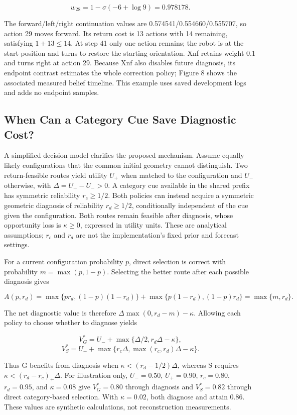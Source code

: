 \documentclass[11pt,a4paper]{article}
\begin{document}
\[
w_{28}=1-\sigma(-6+\log9)=0.978178.
\]

The forward/left/right continuation values are 0.574541/0.554660/0.555707, so action 29 moves forward. Its return cost is 13 actions with 14 remaining, satisfying \(1+13\le14\). At step 41 only one action remains; the robot is at the start position and turns to restore the starting orientation. Xnf retains weight 0.1 and turns right at action 29. Because Xnf also disables future diagnosis, its endpoint contrast estimates the whole correction policy; Figure 8 shows the associated measured belief timeline. This example uses saved development logs and adds no endpoint samples.

\hypertarget{when-can-a-category-cue-save-diagnostic-cost}{%
\subsection{When Can a Category Cue Save Diagnostic Cost?}\label{when-can-a-category-cue-save-diagnostic-cost}}

A simplified decision model clarifies the proposed mechanism. Assume equally likely configurations that the common initial geometry cannot distinguish. Two return-feasible routes yield utility \(U_+\) when matched to the configuration and \(U_-\) otherwise, with \(\Delta=U_+-U_->0\). A category cue available in the shared prefix has symmetric reliability \(r_c\ge1/2\). Both policies can instead acquire a symmetric geometric diagnosis of reliability \(r_d\ge1/2\), conditionally independent of the cue given the configuration. Both routes remain feasible after diagnosis, whose opportunity loss is \(\kappa\ge0\), expressed in utility units. These are analytical assumptions; \(r_c\) and \(r_d\) are not the implementation's fixed prior and forecast settings.

For a current configuration probability \(p\), direct selection is correct with probability \(m=\max(p,1-p)\). Selecting the better route after each possible diagnosis gives

\[
A(p,r_d)=\max\{pr_d,(1-p)(1-r_d)\}
+\max\{p(1-r_d),(1-p)r_d\}
=\max\{m,r_d\}.
\]

The net diagnostic value is therefore \(\Delta\max(0,r_d-m)-\kappa\). Allowing each policy to choose whether to diagnose yields

\[
V_G^*=U_-+\max\{\Delta/2,r_d\Delta-\kappa\},
\] \[
V_S^*=U_-+\max\{r_c\Delta,\max(r_c,r_d)\Delta-\kappa\}.
\]

Thus G benefits from diagnosis when \(\kappa<(r_d-1/2)\Delta\), whereas S requires \(\kappa<(r_d-r_c)_+\Delta\). For illustration only, \(U_-=0.50\), \(U_+=0.90\), \(r_c=0.80\), \(r_d=0.95\), and \(\kappa=0.08\) give \(V_G^*=0.80\) through diagnosis and \(V_S^*=0.82\) through direct category-based selection. With \(\kappa=0.02\), both diagnose and attain 0.86. These values are synthetic calculations, not reconstruction measurements.
\end{document}
